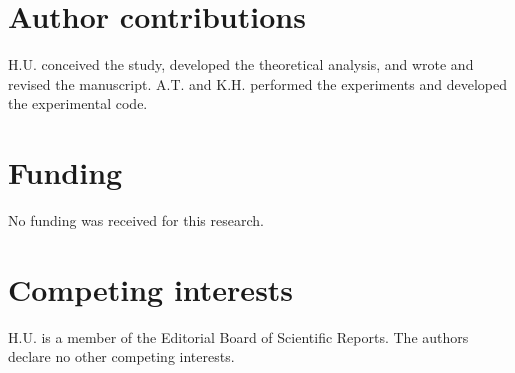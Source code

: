 \documentclass[10pt,a4paper]{article}
\begin{document}
\section*{Author contributions}
H.U. conceived the study, developed the theoretical analysis, and wrote and revised the manuscript. A.T. and K.H. performed the experiments and developed the experimental code.

\section*{Funding}
No funding was received for this research.

\section*{Competing interests}
H.U. is a member of the Editorial Board of Scientific Reports. The authors declare no other competing interests.
\end{document}
